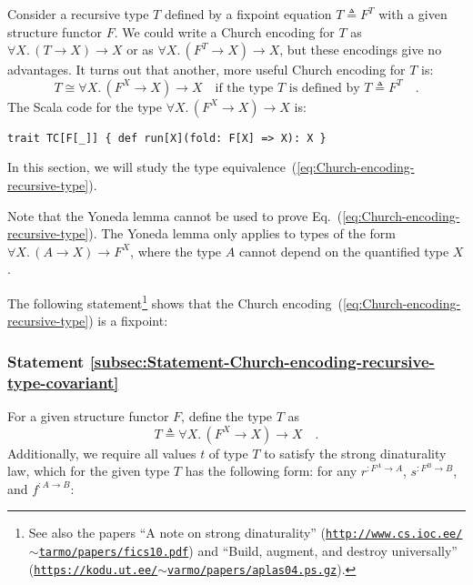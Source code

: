 Consider a recursive type $T$ defined by a fixpoint equation $T\triangleq F^{T}$
with a given structure functor $F$. We could write a Church encoding
for $T$ as $\forall X.\,(T\rightarrow X)\rightarrow X$ or as $\forall X.\,(F^{T}\rightarrow X)\rightarrow X$,
but these encodings give no advantages. It turns out that another,
more useful Church encoding for $T$ is:
\begin{equation}
T\cong\forall X.\,(F^{X}\rightarrow X)\rightarrow X\quad\text{if the type }T\text{ is defined by }T\triangleq F^{T}\quad.\label{eq:Church-encoding-recursive-type}
\end{equation}
The Scala code for the type $\forall X.\,(F^{X}\rightarrow X)\rightarrow X$
is:
\begin{lstlisting}
trait TC[F[_]] { def run[X](fold: F[X] => X): X }
\end{lstlisting}
In this section, we will study the type equivalence~(\ref{eq:Church-encoding-recursive-type}).

Note that the Yoneda lemma cannot be used to prove Eq.~(\ref{eq:Church-encoding-recursive-type}).
The Yoneda lemma only applies to types of the form $\forall X.\,(A\rightarrow X)\rightarrow F^{X}$,
where the type $A$ cannot depend on the quantified type $X$. 

The following statement\footnote{See also the papers \textsf{``}A note on strong dinaturality\textsf{''} (\texttt{\href{https://web.archive.org/web/20110601105059/http://www.cs.ioc.ee/~tarmo/papers/fics10.pdf}{http://www.cs.ioc.ee/$\sim$tarmo/papers/fics10.pdf}})
and \textsf{``}Build, augment, and destroy universally\textsf{''} (\texttt{\href{https://kodu.ut.ee/~varmo/papers/aplas04.ps.gz}{https://kodu.ut.ee/$\sim$varmo/papers/aplas04.ps.gz}}).} shows that the Church encoding~(\ref{eq:Church-encoding-recursive-type})
is a fixpoint:

\subsubsection{Statement \label{subsec:Statement-Church-encoding-recursive-type-covariant}\ref{subsec:Statement-Church-encoding-recursive-type-covariant}}

For a given structure functor $F$, define the type $T$ as
\[
T\triangleq\forall X.\,(F^{X}\rightarrow X)\rightarrow X\quad.
\]
Additionally, we require all values $t$ of type $T$ to satisfy the
strong dinaturality law,
which for the given type $T$ has the following form: for any $r^{:F^{A}\rightarrow A}$,
$s^{:F^{B}\rightarrow B}$, and $f^{:A\rightarrow B}$: 

